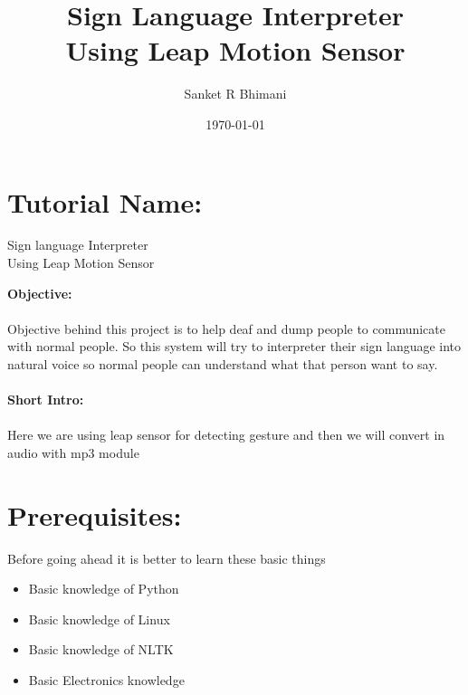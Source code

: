 \documentclass[11pt,a4paper]{article}
\title{\textbf{\Huge{Sign Language Interpreter}}\vspace{6mm}\\Using Leap Motion Sensor}
\author{Sanket R Bhimani}
\date{\today}
\newcommand\tab[1][1cm]{\hspace*{#1}}
\begin{document}
	\maketitle
	\newpage
	\tableofcontents
	\newpage
	\section{Tutorial Name:}
	\begin{center}\huge{Sign language Interpreter}\\\Large{Using Leap Motion Sensor}\end{center}
	\vspace{15mm}
	\textbf{\Large{Objective:}}\\
	\vspace{1mm}\\
	Objective behind this project is to help deaf and dump people to communicate with normal people. So this system will try to interpreter their sign language into natural voice so normal people can understand what that person want to say.\\
	\vspace{6mm}\\
	\textbf{\Large{Short Intro:}}\\
	\vspace{1mm}\\
	Here we are using leap sensor for detecting gesture and then we will convert in audio with mp3 module
	\newpage
	\section{Prerequisites:}
	\vspace{1cm}
	\tab Before going ahead it is better to learn these basic things
    \vspace{1cm}
	\begin{itemize}
	    \item Basic knowledge of Python
	    \item Basic knowledge of Linux
	    \item Basic knowledge of NLTK
	    \item Basic Electronics knowledge
	\end{itemize}
	\newpage
\end{document}
